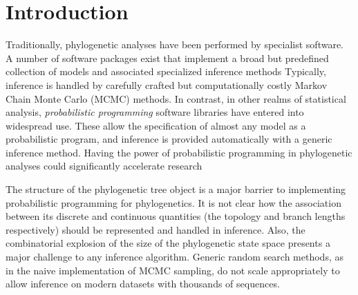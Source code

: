 \section{Introduction}

Traditionally, phylogenetic analyses have been performed by specialist software. A number of software packages exist that implement a broad but predefined collection of models and associated specialized inference methods Typically, inference is handled by carefully crafted but computationally costly Markov Chain Monte Carlo (MCMC) methods. In contrast, in other realms of statistical analysis, \textit{probabilistic programming} software libraries have entered into widespread use. These allow the specification of almost any model as a probabilistic program, and inference is provided automatically with a generic inference method. Having the power of probabilistic programming in phylogenetic analyses could significantly accelerate research 

The structure of the phylogenetic tree object is a major barrier to implementing probabilistic programming for phylogenetics. It is not clear how the association between its discrete and continuous quantities (the topology and branch lengths respectively) should be represented and handled in inference. Also, the combinatorial explosion of the size of the phylogenetic state space presents a major challenge to any inference algorithm. Generic random search methods, as in the naive implementation of MCMC sampling, do not scale appropriately to allow inference on modern datasets with thousands of sequences.

